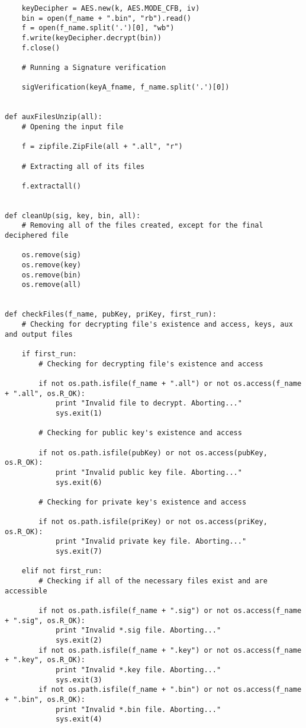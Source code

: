 \documentclass[a4paper,11pt,openright,oneside]{report}
\begin{document}
\begin{verbatim}
    keyDecipher = AES.new(k, AES.MODE_CFB, iv)
    bin = open(f_name + ".bin", "rb").read()
    f = open(f_name.split('.')[0], "wb")
    f.write(keyDecipher.decrypt(bin))
    f.close()

    # Running a Signature verification

    sigVerification(keyA_fname, f_name.split('.')[0])


def auxFilesUnzip(all):
    # Opening the input file

    f = zipfile.ZipFile(all + ".all", "r")

    # Extracting all of its files

    f.extractall()


def cleanUp(sig, key, bin, all):
    # Removing all of the files created, except for the final deciphered file

    os.remove(sig)
    os.remove(key)
    os.remove(bin)
    os.remove(all)


def checkFiles(f_name, pubKey, priKey, first_run):
    # Checking for decrypting file's existence and access, keys, aux and output files

    if first_run:
        # Checking for decrypting file's existence and access

        if not os.path.isfile(f_name + ".all") or not os.access(f_name + ".all", os.R_OK):
            print "Invalid file to decrypt. Aborting..."
            sys.exit(1)

        # Checking for public key's existence and access

        if not os.path.isfile(pubKey) or not os.access(pubKey, os.R_OK):
            print "Invalid public key file. Aborting..."
            sys.exit(6)

        # Checking for private key's existence and access

        if not os.path.isfile(priKey) or not os.access(priKey, os.R_OK):
            print "Invalid private key file. Aborting..."
            sys.exit(7)

    elif not first_run:
        # Checking if all of the necessary files exist and are accessible

        if not os.path.isfile(f_name + ".sig") or not os.access(f_name + ".sig", os.R_OK):
            print "Invalid *.sig file. Aborting..."
            sys.exit(2)
        if not os.path.isfile(f_name + ".key") or not os.access(f_name + ".key", os.R_OK):
            print "Invalid *.key file. Aborting..."
            sys.exit(3)
        if not os.path.isfile(f_name + ".bin") or not os.access(f_name + ".bin", os.R_OK):
            print "Invalid *.bin file. Aborting..."
            sys.exit(4)


\end{verbatim}
\end{document}
